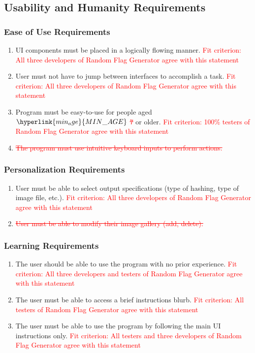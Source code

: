 \documentclass[12pt, titlepage]{article}
\begin{document}
\subsection{Usability and Humanity Requirements}
\subsubsection{Ease of Use Requirements}
\begin{enumerate}[label=UH\arabic*., series=uhs]
    \item UI components must be placed in a logically flowing manner. \textcolor{red}{Fit criterion: All three developers of Random Flag Generator agree with this statement}
    \item User must not have to jump between interfaces to accomplish a task. \textcolor{red}{Fit criterion: All three developers of Random Flag Generator agree with this statement}
    \item Program must be easy-to-use for people aged \textcolor{red}{$\hyperlink{min_age}{MIN\_AGE}$ \sout{7}} or older. \textcolor{red}{Fit criterion: 100\% testers of Random Flag Generator agree with this statement}
    \item \textcolor{red}{\sout{The program must use intuitive keyboard inputs to perform actions.}}
\end{enumerate}
                           
\subsubsection{Personalization Requirements}
\begin{enumerate}[label=UH\arabic*., resume=uhs]
    \item User must be able to select output specifications (type of hashing, type of image file, etc.). \textcolor{red}{Fit criterion: All three developers of Random Flag Generator agree with this statement}
    \item \textcolor{red}{\sout{User must be able to modify their image gallery (add, delete).}}
\end{enumerate} 
\subsubsection{Learning Requirements} 
\begin{enumerate}[label=UH\arabic*., resume=uhs]
    \item The user should be able to use the program with no prior experience. \textcolor{red}{Fit criterion: All three developers and testers of Random Flag Generator agree with this statement}
    \item The user must be able to access a brief instructions blurb. \textcolor{red}{Fit criterion: All testers of Random Flag Generator agree with this statement}
    \item The user must be able to use the program by following the main UI instructions only. \textcolor{red}{Fit criterion: All testers and three developers of Random Flag Generator agree with this statement}
\end{enumerate} 
\end{document}
